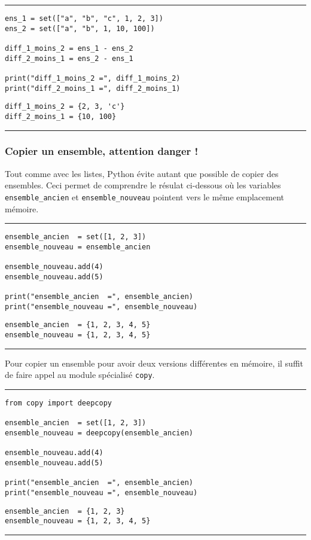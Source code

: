 \bigskip
{\hrule height .5mm}
\begin{verbatim}
ens_1 = set(["a", "b", "c", 1, 2, 3])
ens_2 = set(["a", "b", 1, 10, 100])

diff_1_moins_2 = ens_1 - ens_2
diff_2_moins_1 = ens_2 - ens_1

print("diff_1_moins_2 =", diff_1_moins_2)
print("diff_2_moins_1 =", diff_2_moins_1)
\end{verbatim}
 \color{ForestGreen}
\vspace{-1.5em}
\begin{verbatim}
diff_1_moins_2 = {2, 3, 'c'}
diff_2_moins_1 = {10, 100}
\end{verbatim} \color{Black}
{\hrule height .5mm}
\bigskip


\subsubsection{Copier un ensemble, attention danger !}

Tout comme avec les listes, Python évite autant que possible de copier des ensembles. Ceci permet de comprendre le résulat ci-dessous où les variables \texttt{ensemble\_ancien} et \texttt{ensemble\_nouveau} pointent vers le même emplacement mémoire.


\bigskip
{\hrule height .5mm}
\begin{verbatim}
ensemble_ancien  = set([1, 2, 3])
ensemble_nouveau = ensemble_ancien

ensemble_nouveau.add(4)
ensemble_nouveau.add(5)

print("ensemble_ancien  =", ensemble_ancien)
print("ensemble_nouveau =", ensemble_nouveau)
\end{verbatim}
 \color{ForestGreen}
\vspace{-1.5em}
\begin{verbatim}
ensemble_ancien  = {1, 2, 3, 4, 5}
ensemble_nouveau = {1, 2, 3, 4, 5}
\end{verbatim} \color{Black}
{\hrule height .5mm}
\bigskip


Pour copier un ensemble pour avoir deux versions différentes en mémoire, il suffit de faire appel au module spécialisé \texttt{copy}.


\bigskip
{\hrule height .5mm}
\begin{verbatim}
from copy import deepcopy

ensemble_ancien  = set([1, 2, 3])
ensemble_nouveau = deepcopy(ensemble_ancien)

ensemble_nouveau.add(4)
ensemble_nouveau.add(5)

print("ensemble_ancien  =", ensemble_ancien)
print("ensemble_nouveau =", ensemble_nouveau)
\end{verbatim}
 \color{ForestGreen}
\vspace{-1.5em}
\begin{verbatim}
ensemble_ancien  = {1, 2, 3}
ensemble_nouveau = {1, 2, 3, 4, 5}
\end{verbatim} \color{Black}
{\hrule height .5mm}
\bigskip